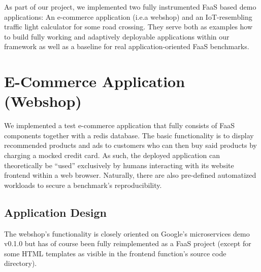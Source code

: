 \documentclass[../main.tex]{subfiles}
\begin{document}
As part of our project, we implemented two fully instrumented FaaS based demo applications:
An e-commerce application (i.e.\@ a webshop) and an IoT-resembling traffic light calculator for some road crossing.
They serve both as examples how to build fully working and adaptively deployable applications 
within our framework as well as a baseline for real application-oriented FaaS benchmarks.

\section{E-Commerce Application (Webshop)}\label{sec:webshop}

We implemented a test e-commerce application that fully consists of FaaS components together with a redis database. 
The basic functionality is to display recommended products and ads to customers 
who can then buy said products by charging a mocked credit card. 
As such, the deployed application can theoretically be ``used'' exclusively by humans 
interacting with its website frontend within a web browser.
Naturally, there are also pre-defined automatized workloads to secure a benchmark's reproducibility.

\subsection{Application Design}\label{ssec:webshopApplicationStructure}

The webshop's functionality is closely oriented on Google’s microservices demo v0.1.0\footnotemark{} 
but has of course been fully reimplemented as a FaaS project 
(except for some HTML templates as visible in the frontend function's source code directory). 
\end{document}
